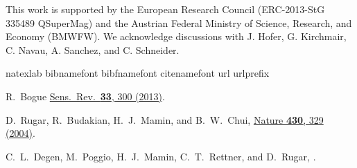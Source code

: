 \documentclass[twocolumn,superscriptaddress,floatfix,preprintnumbers,prl]{revtex4}
\begin{document}
This work is supported by the European Research Council (ERC-2013-StG 335489 QSuperMag) and the Austrian Federal Ministry of Science, Research, and Economy (BMWFW). We acknowledge discussions with J. Hofer, G. Kirchmair, C. Navau, A. Sanchez, and C. Schneider.

 

\begin{thebibliography}{27}


\expandafter\ifx\csname natexlab\endcsname\relax\def\natexlab#1{#1}\fi
\expandafter\ifx\csname bibnamefont\endcsname\relax
  \def\bibnamefont#1{#1}\fi
\expandafter\ifx\csname bibfnamefont\endcsname\relax
  \def\bibfnamefont#1{#1}\fi
\expandafter\ifx\csname citenamefont\endcsname\relax
  \def\citenamefont#1{#1}\fi
\expandafter\ifx\csname url\endcsname\relax
  \def\url#1{\texttt{#1}}\fi
\expandafter\ifx\csname urlprefix\endcsname\relax\def\urlprefix{URL }\fi
\providecommand{\bibinfo}[2]{#2}
\providecommand{\eprint}[2][]{\url{#2}}

R.~Bogue \href{http://www.emeraldinsight.com/doi/full/10.1108/SR-05-2013-678}{Sens.~Rev.~{\bf 33}, 300 (2013)}.

D.~Rugar, R.~Budakian, H.~J.~Mamin, and B.~W.~Chui, \href{http://dx.doi.org/10.1038/nature02658}{Nature {\bf 430}, 329 (2004)}.


C.~L.~Degen, M.~Poggio, H.~J.~Mamin, C.~T.~Rettner, and D.~Rugar, \href{http://www.pnas.org/content/106/5/1313}{}.


\end{thebibliography}
\end{document}
